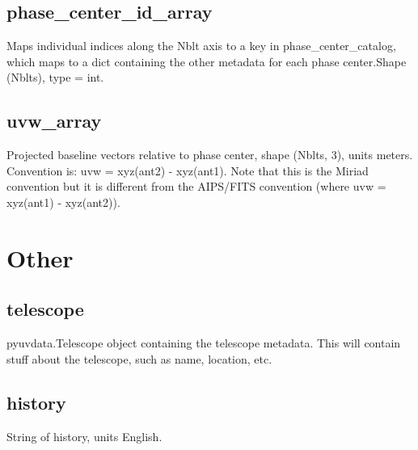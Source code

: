 \documentclass[12pt]{article}
\begin{document}
\subsection{phase\_center\_id\_array}
Maps individual indices along the Nblt axis to a key in phase\_center\_catalog, which maps to a dict containing the other metadata for each phase center.Shape (Nblts), type = int.


\subsection{uvw\_array}
Projected baseline vectors relative to phase center, shape (Nblts, 3), units meters. 
Convention is: uvw = xyz(ant2) - xyz(ant1).
Note that this is the Miriad convention but it is different from the AIPS/FITS convention (where uvw = xyz(ant1) - xyz(ant2)).


\section{Other}

\subsection{telescope}
pyuvdata.Telescope object containing the telescope metadata.
This will contain stuff about the telescope, such as name, location, etc. 

\subsection{history}
String of history, units English.
\end{document}
